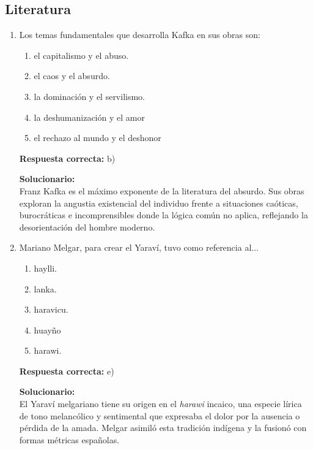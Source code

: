 \subsection*{Literatura}

\begin{enumerate}
	
	\item Los temas fundamentales que desarrolla Kafka en sus obras son:
	
	\begin{enumerate}[label=\alph*)]
		\item el capitalismo y el abuso.
		\item el caos y el absurdo.
		\item la dominación y el servilismo.
		\item la deshumanización y el amor
		\item el rechazo al mundo y el deshonor
	\end{enumerate}
	
	\textbf{Respuesta correcta:} b)
	
	\vspace{2mm}
	\textbf{Solucionario:}\\
	Franz Kafka es el máximo exponente de la literatura del absurdo. Sus obras exploran la angustia existencial del individuo frente a situaciones caóticas, burocráticas e incomprensibles donde la lógica común no aplica, reflejando la desorientación del hombre moderno.
	
	\vspace{6mm}
	
	\item Mariano Melgar, para crear el Yaraví, tuvo como referencia al...
	
	\begin{enumerate}[label=\alph*)]
		\item haylli.
		\item lanka.
		\item haravicu.
		\item huayño
		\item harawi.
	\end{enumerate}
	
	\textbf{Respuesta correcta:} e)
	
	\vspace{2mm}
	\textbf{Solucionario:}\\
	El Yaraví melgariano tiene su origen en el \textit{harawi} incaico, una especie lírica de tono melancólico y sentimental que expresaba el dolor por la ausencia o pérdida de la amada. Melgar asimiló esta tradición indígena y la fusionó con formas métricas españolas.
	
	\vspace{6mm}
	
\end{enumerate}







